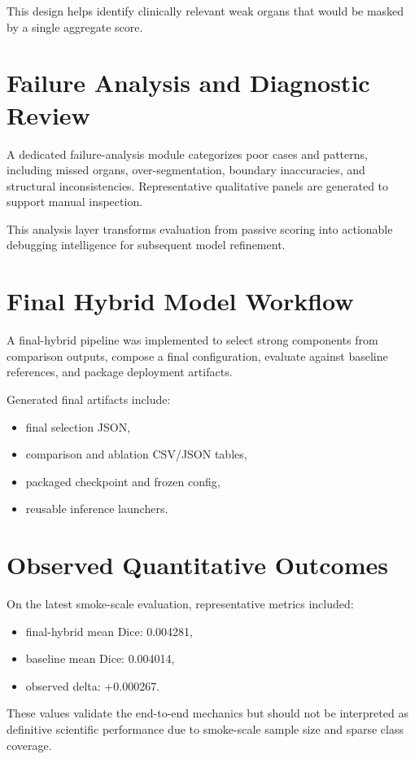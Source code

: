 \documentclass[11pt,a4paper]{article}
\begin{document}
This design helps identify clinically relevant weak organs that would be masked by a single aggregate score.

\section{Failure Analysis and Diagnostic Review}
A dedicated failure-analysis module categorizes poor cases and patterns, including missed organs, over-segmentation, boundary inaccuracies, and structural inconsistencies. Representative qualitative panels are generated to support manual inspection.

This analysis layer transforms evaluation from passive scoring into actionable debugging intelligence for subsequent model refinement.

\section{Final Hybrid Model Workflow}
A final-hybrid pipeline was implemented to select strong components from comparison outputs, compose a final configuration, evaluate against baseline references, and package deployment artifacts.

Generated final artifacts include:
\begin{itemize}
\item final selection JSON,
\item comparison and ablation CSV/JSON tables,
\item packaged checkpoint and frozen config,
\item reusable inference launchers.
\end{itemize}

\section{Observed Quantitative Outcomes}
On the latest smoke-scale evaluation, representative metrics included:
\begin{itemize}
\item final-hybrid mean Dice: 0.004281,
\item baseline mean Dice: 0.004014,
\item observed delta: +0.000267.
\end{itemize}

These values validate the end-to-end mechanics but should not be interpreted as definitive scientific performance due to smoke-scale sample size and sparse class coverage.
\end{document}
